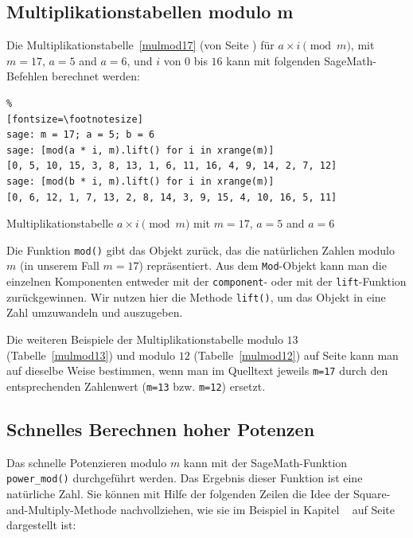 \begin{refsegment}
\hypertarget{nt:AppArith1}{}
\subsection{Multiplikationstabellen modulo m}
\label{nt:AppArith1}{}

Die Multiplikationstabelle~\ref{mulmod17} (von Seite \pageref{SrcArith1a})
für $a \times i \pmod{m}$, mit $m = 17$, $a=5$ and $a=6$, und $i$ von $0$ bis $16$
kann mit folgenden SageMath-Befehlen berechnet werden:

\begin{sagecode}
\begin{Verbatim}%
[fontsize=\footnotesize]
sage: m = 17; a = 5; b = 6
sage: [mod(a * i, m).lift() for i in xrange(m)]
[0, 5, 10, 15, 3, 8, 13, 1, 6, 11, 16, 4, 9, 14, 2, 7, 12]
sage: [mod(b * i, m).lift() for i in xrange(m)]
[0, 6, 12, 1, 7, 13, 2, 8, 14, 3, 9, 15, 4, 10, 16, 5, 11]
\end{Verbatim}
\caption{Multiplikationstabelle $a \times i \pmod{m}$ mit $m = 17$, $a=5$ and $a=6$}
\end{sagecode}

 Die Funktion \verb!mod()! gibt das Objekt zurück, das die natürlichen
Zahlen modulo $m$ (in unserem Fall $m = 17$) repräsentiert.
Aus dem {\tt Mod}-Objekt kann man die einzelnen Komponenten entweder mit der
\texttt{component}- oder mit der \texttt{lift}-Funktion zurückgewinnen.
Wir nutzen hier die Methode \verb!lift()!, um das Objekt in eine Zahl umzuwandeln und
auszugeben.

Die weiteren Beispiele der Multiplikationstabelle modulo $13$ (Tabelle~\ref{mulmod13})
und modulo $12$ (Tabelle~\ref{mulmod12}) auf Seite \pageref{SrcArith1b}
kann man auf dieselbe Weise bestimmen, wenn man im Quelltext jeweils
{\tt m=17} durch den entsprechenden Zahlenwert ({\tt m=13} bzw. {\tt m=12}) ersetzt.


\hypertarget{nt:AppArith2}{}
\subsection{Schnelles Berechnen hoher Potenzen}
\label{nt:AppArith2}{}

Das schnelle Potenzieren modulo $m$ kann mit der SageMath-Funktion \verb!power_mod()!
durchgeführt werden. Das Ergebnis dieser Funktion ist eine natürliche Zahl.
Sie können mit Hilfe der folgenden Zeilen die Idee der Square-and-Multiply-Methode
nachvollziehen, wie sie im Beispiel in Kapitel \glqq {}\grqq~
auf Seite \pageref{SrcArith2} dargestellt ist:


\end{refsegment}
